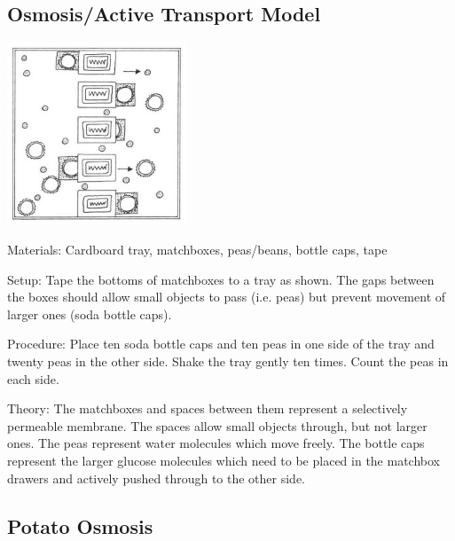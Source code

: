 \begin{multicols}{2}
\subsection{Osmosis/Active Transport Model} %

\begin{center}
\includegraphics[width=0.4\textwidth]{./img/vso/active-transport.jpg}
\end{center}

\begin{description*}
\item[Materials:]{Cardboard tray, matchboxes, peas/beans, bottle caps, tape}
\item[Setup:]{Tape the bottoms of matchboxes to a tray as shown. The gaps between the boxes should allow small objects to pass (i.e. peas) but prevent
movement of larger ones (soda bottle caps).}
\item[Procedure:]{Place ten soda bottle caps and ten peas in one
side of the tray and twenty peas in the other side. Shake the tray gently ten times. Count the
peas in each side.}
\item[Theory:]{The
matchboxes and spaces between
them represent a selectively
permeable membrane. The spaces
allow small objects through, but
not larger ones. The peas
represent water molecules which
move freely. The bottle caps
represent the larger glucose
molecules which need to be
placed in the matchbox drawers
and actively pushed through to
the other side.}
\end{description*}

\subsection{Potato Osmosis}


\end{multicols}
